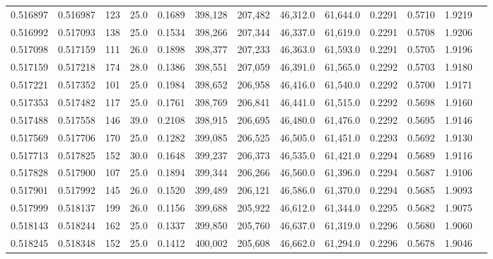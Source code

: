 \begin{tabular}{rrrrrrrrrrrrr}
0.516897 & 0.516987 &   123 & 25.0 &                                     0.1689 & 398,128 & 207,482 &  46,312.0 &  61,644.0 & 0.2291 & 0.5710 & 1.9219 \\
0.516992 & 0.517093 &   138 & 25.0 &                                     0.1534 & 398,266 & 207,344 &  46,337.0 &  61,619.0 & 0.2291 & 0.5708 & 1.9206 \\
0.517098 & 0.517159 &   111 & 26.0 &                                     0.1898 & 398,377 & 207,233 &  46,363.0 &  61,593.0 & 0.2291 & 0.5705 & 1.9196 \\
0.517159 & 0.517218 &   174 & 28.0 &                                     0.1386 & 398,551 & 207,059 &  46,391.0 &  61,565.0 & 0.2292 & 0.5703 & 1.9180 \\
0.517221 & 0.517352 &   101 & 25.0 &                                     0.1984 & 398,652 & 206,958 &  46,416.0 &  61,540.0 & 0.2292 & 0.5700 & 1.9171 \\
0.517353 & 0.517482 &   117 & 25.0 &                                     0.1761 & 398,769 & 206,841 &  46,441.0 &  61,515.0 & 0.2292 & 0.5698 & 1.9160 \\
0.517488 & 0.517558 &   146 & 39.0 &                                     0.2108 & 398,915 & 206,695 &  46,480.0 &  61,476.0 & 0.2292 & 0.5695 & 1.9146 \\
0.517569 & 0.517706 &   170 & 25.0 &                                     0.1282 & 399,085 & 206,525 &  46,505.0 &  61,451.0 & 0.2293 & 0.5692 & 1.9130 \\
0.517713 & 0.517825 &   152 & 30.0 &                                     0.1648 & 399,237 & 206,373 &  46,535.0 &  61,421.0 & 0.2294 & 0.5689 & 1.9116 \\
0.517828 & 0.517900 &   107 & 25.0 &                                     0.1894 & 399,344 & 206,266 &  46,560.0 &  61,396.0 & 0.2294 & 0.5687 & 1.9106 \\
0.517901 & 0.517992 &   145 & 26.0 &                                     0.1520 & 399,489 & 206,121 &  46,586.0 &  61,370.0 & 0.2294 & 0.5685 & 1.9093 \\
0.517999 & 0.518137 &   199 & 26.0 &                                     0.1156 & 399,688 & 205,922 &  46,612.0 &  61,344.0 & 0.2295 & 0.5682 & 1.9075 \\
0.518143 & 0.518244 &   162 & 25.0 &                                     0.1337 & 399,850 & 205,760 &  46,637.0 &  61,319.0 & 0.2296 & 0.5680 & 1.9060 \\
0.518245 & 0.518348 &   152 & 25.0 &                                     0.1412 & 400,002 & 205,608 &  46,662.0 &  61,294.0 & 0.2296 & 0.5678 & 1.9046 \\

\end{tabular}
